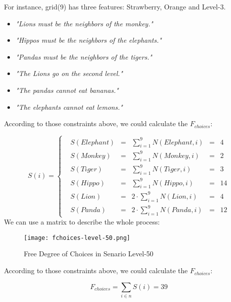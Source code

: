 \documentclass{mcmthesis}
\begin{document}
				For instance, grid(9) has three features: Strawberry, Orange and Level-3.
				
				\begin{itemize}
					\item \emph{"Lions must be the neighbors of the monkey."}
					\item \emph{"Hippos must be the neighbors of the elephants."}
					\item \emph{"Pandas must be the neighbors of the tigers."}
					\item \emph{"The Lions go on the second level."}
					\item \emph{"The pandas cannot eat bananas."}
					\item \emph{"The elephants cannot eat lemons."}
				\end{itemize}
			
				According to those constraints above, we could calculate the $F_{choices}$:


				\begin{equation}
					S(i)=\left\{
					\begin{aligned}
					& S (Elephant) & = & \sum _ { i = 1 } ^ { 9 } N (Elephant, i ) & = & 4 \\
					& S (Monkey) & = & \sum _ { i = 1 } ^ { 9 } N (Monkey, i ) & = & 2 \\
					& S (Tiger) & = & \sum _ { i = 1 } ^ { 9 } N (Tiger, i ) & = & 3 \\
					& S (Hippo) & = & \sum _ { i = 1 } ^ { 9 } N (Hippo, i ) & = & 14 \\
					& S (Lion) & = & 2 \cdot \sum _ { i = 1 } ^ { 9 } N (Lion, i ) & = & 4 \\
					& S (Panda) & = & 2 \cdot \sum _ { i = 1 } ^ { 9 } N (Panda, i ) & = & 12
					\end{aligned}
					\right.
				\end{equation}
				We can use a matrix to describe the whole process:
				
				\begin{figure}[h]
					\small
					\centering
					\texttt{[image: fchoices-level-50.png]}
					\caption{Free Degree of Choices in Senario Level-50} \label{fig:fchoices-level-50}
				\end{figure}
				
				
				According to those constraints above, we could calculate the $F_{choices}$:
				
				\begin{equation}
				F_{choices} = \sum _ { i \in n } S ( i ) = 39
				\end{equation}
				
\end{document}
